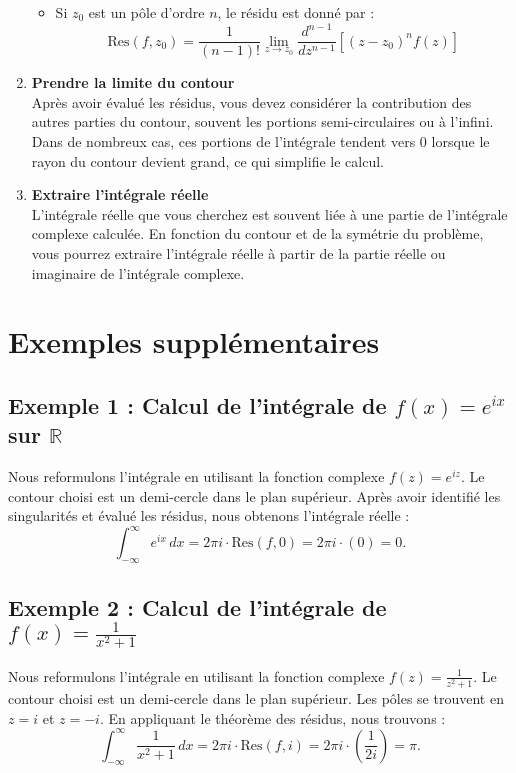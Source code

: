 \documentclass[a4paper,11pt]{article}
\begin{document}
\begin{enumerate}
\begin{itemize}
        \item Si \( z_0 \) est un pôle d'ordre \( n \), le résidu est donné par :
        \[
        \text{Res}(f, z_0) = \frac{1}{(n-1)!} \lim_{z \to z_0} \frac{d^{n-1}}{dz^{n-1}} \left[ (z - z_0)^n f(z) \right]
        \]
    \end{itemize}

    \item \textbf{Prendre la limite du contour} \\
    Après avoir évalué les résidus, vous devez considérer la contribution des autres parties du contour, souvent les portions semi-circulaires ou à l'infini. Dans de nombreux cas, ces portions de l'intégrale tendent vers 0 lorsque le rayon du contour devient grand, ce qui simplifie le calcul.

    \item \textbf{Extraire l'intégrale réelle} \\
    L'intégrale réelle que vous cherchez est souvent liée à une partie de l'intégrale complexe calculée. En fonction du contour et de la symétrie du problème, vous pourrez extraire l'intégrale réelle à partir de la partie réelle ou imaginaire de l'intégrale complexe.
\end{enumerate}

\section{Exemples supplémentaires}

\subsection{Exemple 1 : Calcul de l'intégrale de \( f(x) = e^{ix} \) sur \( \mathbb{R} \)}
Nous reformulons l'intégrale en utilisant la fonction complexe \( f(z) = e^{iz} \). Le contour choisi est un demi-cercle dans le plan supérieur. Après avoir identifié les singularités et évalué les résidus, nous obtenons l'intégrale réelle :
\[
\int_{-\infty}^{\infty} e^{ix} \, dx = 2\pi i \cdot \text{Res}(f, 0) = 2\pi i \cdot (0) = 0.
\]

\subsection{Exemple 2 : Calcul de l'intégrale de \( f(x) = \frac{1}{x^2 + 1} \)}
Nous reformulons l'intégrale en utilisant la fonction complexe \( f(z) = \frac{1}{z^2 + 1} \). Le contour choisi est un demi-cercle dans le plan supérieur. Les pôles se trouvent en \( z = i \) et \( z = -i \). En appliquant le théorème des résidus, nous trouvons :
\[
\int_{-\infty}^{\infty} \frac{1}{x^2 + 1} \, dx = 2\pi i \cdot \text{Res}(f, i) = 2\pi i \cdot \left(\frac{1}{2i}\right) = \pi.
\]
\end{document}
